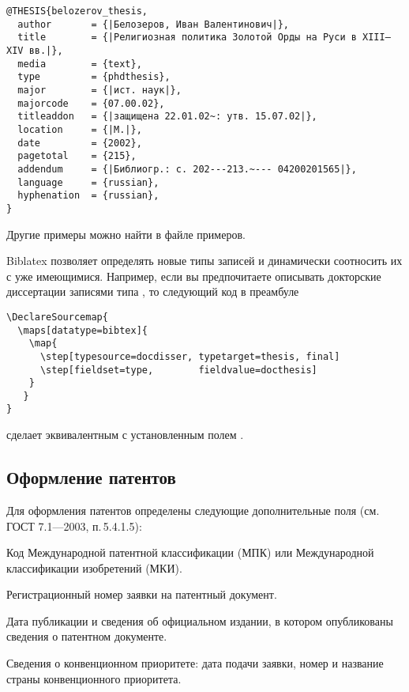 \documentclass[10pt,a4paper,headings=small,numbers=enddot,english,russian]{ltxdockit}[2011/03/25]
\newcommand*{\biblatex}{Biblatex\xspace}
\newcommand*{\gostbibname}[1][]{ГОСТ#1 7.1---2003}
\newcommand*{\gostbibref}[2][]{\gostbibname[#1], п.\,#2}
\newcommand*{\noitemspace}{\vspace{-\itemsep}\vspace{-\parsep}\vspace{-.6ex}}
\begin{document}
\begin{lstlisting}[style=bibtex,escapechar=|]
@THESIS{belozerov_thesis,
  author       = {|Белозеров, Иван Валентинович|},
  title        = {|Религиозная политика Золотой Орды на Руси в XIII—XIV вв.|},
  media        = {text},
  type         = {phdthesis},
  major        = {|ист. наук|},
  majorcode    = {07.00.02},
  titleaddon   = {|защищена 22.01.02~: утв. 15.07.02|},
  location     = {|М.|},
  date         = {2002},
  pagetotal    = {215},
  addendum     = {|Библиогр.: с. 202---213.~--- 04200201565|},
  language     = {russian},
  hyphenation  = {russian},
}
\end{lstlisting}

Другие примеры можно найти в файле примеров.

\biblatex позволяет определять новые типы записей и динамически соотносить их
с уже имеющимися.
Например, если вы предпочитаете описывать докторские диссертации записями типа
, то следующий код в преамбуле

\begin{lstlisting}[style=latex]
\DeclareSourcemap{
  \maps[datatype=bibtex]{
    \map{
      \step[typesource=docdisser, typetarget=thesis, final]
      \step[fieldset=type,        fieldvalue=docthesis]
    }
   }
}
\end{lstlisting}

\noindent сделает  эквивалентным  с установленным полем
.

\subsection{Оформление патентов}
\label{sec:patent}

Для оформления патентов определены следующие дополнительные поля (см. \gostbibref{}{5.4.1.5}):

\begin{fieldlist}


Код Международной патентной классификации (МПК) или Международной
классификации изобретений (МКИ).


Регистрационный номер заявки на патентный документ.

\noitemspace%

Дата публикации и сведения об официальном издании, в котором опубликованы сведения о
патентном документе.

\noitemspace%
\noitemspace%

Сведения о конвенционном приоритете: дата подачи заявки, номер и название
страны конвенционного приоритета.

\end{fieldlist}
\end{document}
